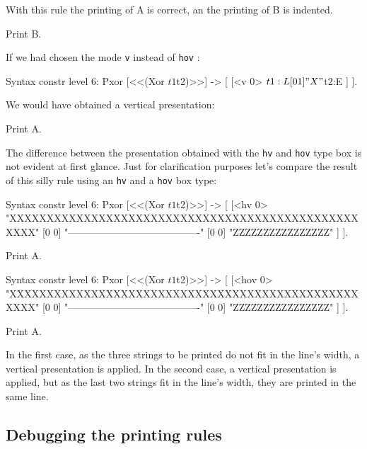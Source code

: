 \begin{enumerate}
With this rule the printing of A is correct, an the printing of B is
indented.

\begin{coq_example}
Print B.
\end{coq_example}

If we had chosen the mode \verb+v+ instead of \verb+hov+ :

\begin{coq_example*}
Syntax constr level 6:
  Pxor [<<(Xor $t1 $t2)>>] -> [ [<v 0> $t1:L [0 1] " X " $t2:E ] ].
\end{coq_example*}

We would have obtained a vertical presentation:

\begin{coq_example}
Print A.
\end{coq_example}

The difference between the presentation obtained with the \verb+hv+
and \verb+hov+ type box is not evident at first glance. Just for
clarification purposes let's compare the result of this silly rule
using an \verb+hv+ and a \verb+hov+ box type:

\begin{coq_example*}
Syntax constr level 6:
  Pxor [<<(Xor $t1 $t2)>>] ->
   [ [<hv 0> "XXXXXXXXXXXXXXXXXXXXXXXXXXXXXXXXXXXXXXXXXXXXXXXXXXX"
       [0 0] "----------------------------------------"
       [0 0] "ZZZZZZZZZZZZZZZZ" ] ].
\end{coq_example*}
\begin{coq_example}
Print A.
\end{coq_example}
\begin{coq_example*}
Syntax constr level 6:
  Pxor [<<(Xor $t1 $t2)>>] ->
   [ [<hov 0> "XXXXXXXXXXXXXXXXXXXXXXXXXXXXXXXXXXXXXXXXXXXXXXXXXXX"
       [0 0]  "----------------------------------------"
       [0 0]  "ZZZZZZZZZZZZZZZZ" ] ].
\end{coq_example*}
\begin{coq_example}
Print A.
\end{coq_example}

In the first case, as the three strings to be printed do not fit in
the line's width, a vertical presentation is applied. In the second
case, a vertical presentation is applied, but as the last two strings
fit in the line's width, they are printed in the same line.


\end{enumerate}

\subsection{Debugging the printing rules}

